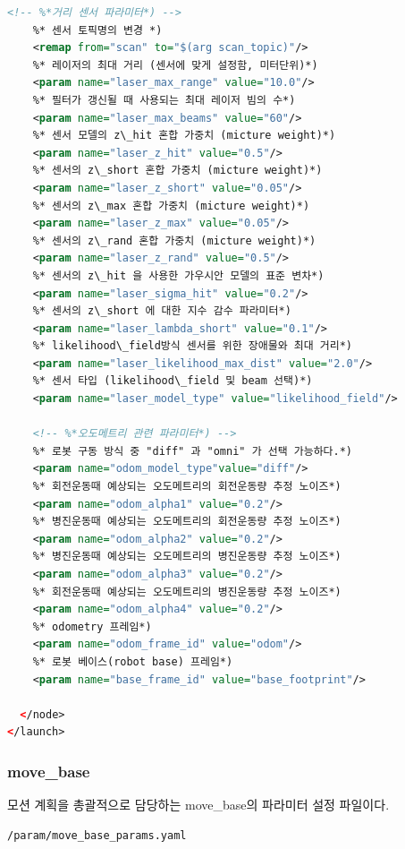 \begin{lstlisting}[language=XML]
    <!-- %*거리 센서 파라미터*) -->
    %* 센서 토픽명의 변경 *)
    <remap from="scan" to="$(arg scan_topic)"/>
    %* 레이저의 최대 거리 (센서에 맞게 설정함, 미터단위)*)
    <param name="laser_max_range" value="10.0"/>
    %* 필터가 갱신될 때 사용되는 최대 레이저 빔의 수*)
    <param name="laser_max_beams" value="60"/>
    %* 센서 모델의 z\_hit 혼합 가중치 (micture weight)*)
    <param name="laser_z_hit" value="0.5"/>
    %* 센서의 z\_short 혼합 가중치 (micture weight)*)
    <param name="laser_z_short" value="0.05"/>
    %* 센서의 z\_max 혼합 가중치 (micture weight)*)
    <param name="laser_z_max" value="0.05"/>
    %* 센서의 z\_rand 혼합 가중치 (micture weight)*)
    <param name="laser_z_rand" value="0.5"/>
    %* 센서의 z\_hit 을 사용한 가우시안 모델의 표준 변차*)
    <param name="laser_sigma_hit" value="0.2"/>
    %* 센서의 z\_short 에 대한 지수 감수 파라미터*)
    <param name="laser_lambda_short" value="0.1"/>
    %* likelihood\_field방식 센서를 위한 장애물와 최대 거리*)
    <param name="laser_likelihood_max_dist" value="2.0"/>
    %* 센서 타입 (likelihood\_field 및 beam 선택)*)
    <param name="laser_model_type" value="likelihood_field"/>

    <!-- %*오도메트리 관련 파라미터*) -->
    %* 로봇 구동 방식 중 "diff" 과 "omni" 가 선택 가능하다.*)
    <param name="odom_model_type"value="diff"/>
    %* 회전운동때 예상되는 오도메트리의 회전운동량 추정 노이즈*)
    <param name="odom_alpha1" value="0.2"/>
    %* 병진운동때 예상되는 오도메트리의 회전운동량 추정 노이즈*)
    <param name="odom_alpha2" value="0.2"/>
    %* 병진운동때 예상되는 오도메트리의 병진운동량 추정 노이즈*)
    <param name="odom_alpha3" value="0.2"/>
    %* 회전운동때 예상되는 오도메트리의 병진운동량 추정 노이즈*)
    <param name="odom_alpha4" value="0.2"/>
    %* odometry 프레임*)
    <param name="odom_frame_id" value="odom"/>
    %* 로봇 베이스(robot base) 프레임*)
    <param name="base_frame_id" value="base_footprint"/>

  </node>
</launch>
\end{lstlisting}

\subsubsection{move\_base}
모션 계획을 총괄적으로 담당하는 move\_base의 파라미터 설정 파일이다.

\vspace{\baselineskip}
\begin{lstlisting}[language=ROS]
/param/move_base_params.yaml
\end{lstlisting}

